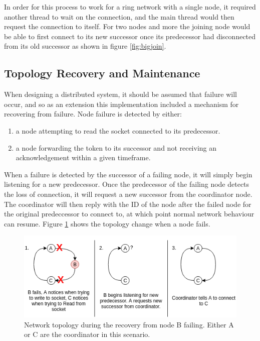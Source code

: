 \documentclass[12pt]{article}
\begin{document}
In order for this process to work for a ring network with a single node,
it required another thread to wait on the connection, and the main thread
would then request the connection to itself. For two nodes and more the
joining node would be able to first connect to its new successor once its
predecessor had disconnected from its old successor as shown in figure \ref{fig:bigjoin}. 

\subsection{Topology Recovery and Maintenance}

When designing a distributed system, it should be assumed that failure will occur, and so as an extension this implementation included a mechanism for recovering from failure. Node failure is detected by either:
\begin{enumerate}
	\item a node attempting to read the socket connected to its predecessor.
	\item a node forwarding the token to its successor and not receiving an acknowledgement within a given timeframe.
\end{enumerate}

When a failure is detected by the successor of a failing node, it will simply begin listening for a new predecessor. Once the predecessor of the failing node detects the loss of connection, it will request a new successor from the coordinator node. The coordinator will then reply with the ID of the node after the failed node for the original predeccessor to connect to, at which point normal network behaviour can resume. Figure \ref{fig:failure} shows the topology change when a node fails.

\begin{figure}[!ht]
	\centering
	\includegraphics[width=\linewidth]{images/failure}
	\caption{Network topology during the recovery from node B failing. Either A or C are the coordinator in this scenario.}
	\label{fig:failure}
\end{figure}
\end{document}
